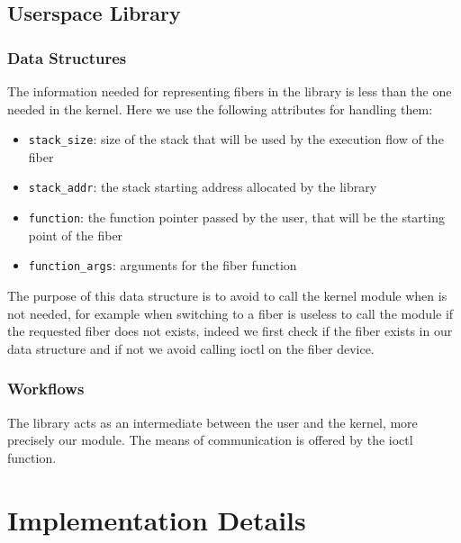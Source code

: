 \documentclass[a4paper,10pt]{article}
\begin{document}
\subsection{Userspace Library}

\subsubsection{Data Structures}
The information needed for representing fibers in the library is less than the one needed in the kernel. Here we use the following attributes for handling them:
\begin{itemize}
	\item \lstinline{stack_size}: size of the stack that will be used by the execution flow of the fiber
	\item \lstinline{stack_addr}: the stack starting address allocated by the library
	\item \lstinline[language={}]{function}: the function pointer passed by the user, that will be the starting point of the fiber
	\item \lstinline{function_args}: arguments for the fiber function
\end{itemize}

The purpose of this data structure is to avoid to call the kernel module when is not needed, for example when switching to a fiber is useless to call the module if the requested fiber does not exists, indeed we first check if the fiber exists in our data structure and if not we avoid calling ioctl on the fiber device.

\subsubsection{Workflows}\label{subsubsec:lib-works}
The library acts as an intermediate between the user and the kernel, more precisely our module. The means of communication is offered by the ioctl function.

\section{Implementation Details}
\end{document}
